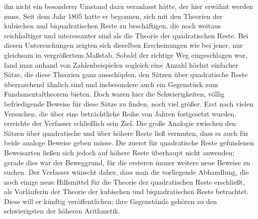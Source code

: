 ihn nicht ein besonderer Umstand dazu veranlasst hätte, der hier erwähnt werden muss. Seit dem Jahr 1805 hatte er begonnen, sich mit den Theorien der kubischen und biquadratischen Reste zu beschäftigen, die noch weitaus reichhaltiger und interessanter sind als die Theorie der quadratischen Reste. Bei diesen Untersuchungen zeigten sich dieselben Erscheinungen wie bei jener, nur gleichsam in vergrößertem Maßstab. Sobald der richtige Weg eingeschlagen war, fand man anhand von Zahlenbeispielen sogleich eine Anzahl höchst einfacher Sätze, die diese Theorien ganz ausschöpfen, den Sätzen über quadratische Reste überraschend ähnlich sind und insbesondere auch ein Gegenstück zum Fundamentaltheorem bieten. Doch waren hier die Schwierigkeiten, völlig befriedigende Beweise für diese Sätze zu finden, noch viel größer. Erst nach vielen Versuchen, die über eine beträchtliche Reihe von Jahren fortgesetzt wurden, erreichte der Verfasser schließlich sein Ziel. Die große Analogie zwischen den Sätzen über quadratische und über höhere Reste ließ vermuten, dass es auch für beide analoge Beweise geben müsse. Die zuerst für quadratische Reste gefundenen Beweisarten ließen sich jedoch auf höhere Reste überhaupt nicht anwenden; gerade dies war der Beweggrund, für die ersteren immer weitere neue Beweise zu suchen. Der Verfasser wünscht daher, dass man die vorliegende Abhandlung, die noch einige neue Hilfsmittel für die Theorie der quadratischen Reste erschließt, als Vorläuferin der Theorie der kubischen und biquadratischen Reste betrachtet. Diese will er künftig veröffentlichen; ihre Gegenstände gehören zu den schwierigsten der höheren Arithmetik.

